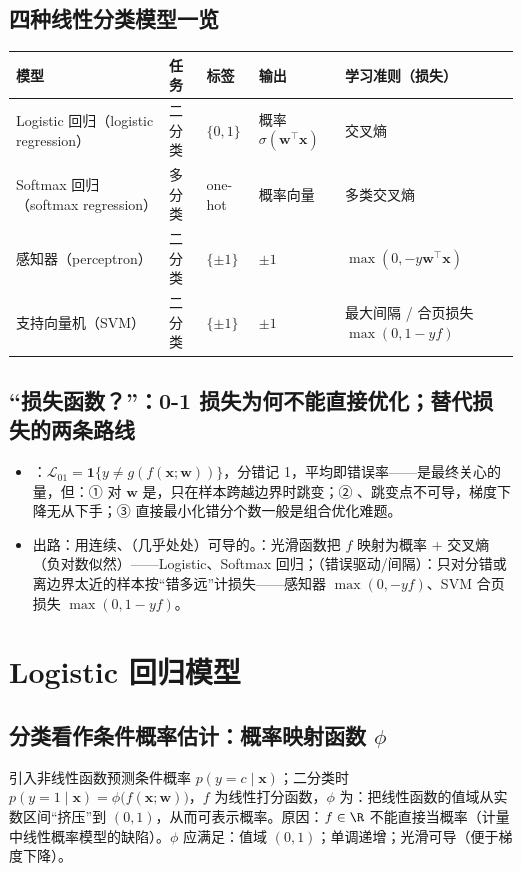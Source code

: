 \subsection{四种线性分类模型一览}
\begin{center}\small
\begin{tabularx}{\linewidth}{@{}p{5.2cm}p{1.2cm}p{1.3cm}p{2.4cm}L@{}}
\toprule
模型 & 任务 & 标签 & 输出 & 学习准则（损失）\\
\midrule
Logistic 回归（logistic regression） & 二分类 & $\{0,1\}$ & 概率 $\sigma(\bm w^\top\bm x)$ & 交叉熵 \\
Softmax 回归（softmax regression） & 多分类 & one-hot & 概率向量 & 多类交叉熵 \\
感知器（perceptron） & 二分类 & $\{\pm1\}$ & $\pm1$ & $\max(0,-y\bm w^\top\bm x)$ \\
支持向量机（SVM） & 二分类 & $\{\pm1\}$ & $\pm1$ & 最大间隔 / 合页损失 $\max(0,1-yf)$ \\
\bottomrule
\end{tabularx}
\end{center}

\subsection{“损失函数？”：0-1 损失为何不能直接优化；替代损失的两条路线}
\begin{itemize}
\item {}：$\mathcal L_{01}=\mathbf 1\{y\neq g(f(\bm x;\bm w))\}$，分错记 1，平均即错误率——是最终关心的量，但：① 对 $\bm w$ 是，只在样本跨越边界时跳变；② 、跳变点不可导，梯度下降无从下手；③ 直接最小化错分个数一般是组合优化难题。
\item 出路：用连续、（几乎处处）可导的。：光滑函数把 $f$ 映射为概率 + 交叉熵（负对数似然）——Logistic、Softmax 回归；（错误驱动/间隔）：只对分错或离边界太近的样本按“错多远”计损失——感知器 $\max(0,-yf)$、SVM 合页损失 $\max(0,1-yf)$。
\end{itemize}

\section{Logistic 回归模型}

\subsection{分类看作条件概率估计：概率映射函数 \texorpdfstring{$\phi$}{phi}}
引入非线性函数预测条件概率 $p(y=c\mid\bm x)$；二分类时 $p(y=1\mid\bm x)=\phi\big(f(\bm x;\bm w)\big)$，$f$ 为线性打分函数，$\phi$ 为：把线性函数的值域从实数区间“挤压”到 $(0,1)$，从而可表示概率。原因：$f\in\R$ 不能直接当概率（计量中线性概率模型的缺陷）。$\phi$ 应满足：值域 $(0,1)$；单调递增；光滑可导（便于梯度下降）。

